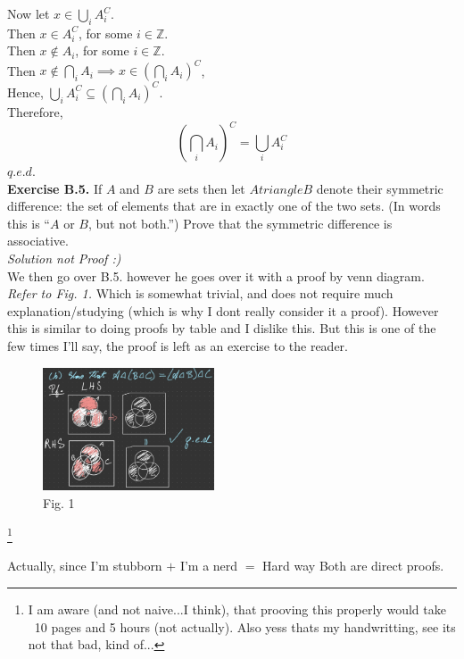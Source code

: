 \documentclass[12pt]{book}
\begin{document}
\noindent Now let $x \in \bigcup\limits_i A_i^{C}$. \\
Then $x \in A_i^{C}$, for some $i\in \mathbb{Z}$.\\
Then $x \notin A_i$, for some $i\in \mathbb{Z}$.\\
Then $x \notin \bigcap\limits_i A_i \implies x\in \left( \bigcap\limits_i A_i\right)^{C}$,\\
Hence, $\bigcup\limits_i A_i^{C} \subseteq \left( \bigcap\limits_i A_i\right)^{C}$.\\

Therefore, \\
$$\left( \bigcap\limits_i A_i\right)^{C}=\bigcup\limits_i A_i^{C}$$\hfill$q.e.d.$\\


\noindent \textbf{Exercise B.5. } If $A$ and $B$ are sets then let $A triangle B$ denote their symmetric difference: the set of elements that are in exactly one of the two sets. (In words this is “$A$ or $B$, but not both.”) Prove that the symmetric difference is associative.\\

\noindent \textit{Solution not Proof :)} \\
\indent We then go over B.5. however he goes over it with a proof by venn diagram. \textit{Refer to Fig. 1.} Which is somewhat trivial, and does not require much explanation/studying (which is why I dont really consider it a proof). 
However this is similar to doing proofs by table and I dislike this. But this is one of the few times I'll say, the proof is left as an exercise to the reader.\begin{figure}[h]
\begin{center}
\includegraphics[width=2in]{1-20-23 Venn Diagram Proof of B.5.jpg}
\caption*{Fig. 1}
\end{center}
\end{figure}\footnote{I am aware (and not naive...I think), that prooving this properly would take ~10 pages and 5 hours (not actually). Also yess thats my handwritting, see its not that bad, kind of...}

Actually, since I'm stubborn $+$ I'm a nerd $=$ Hard way
Both are direct proofs.
\end{document}
